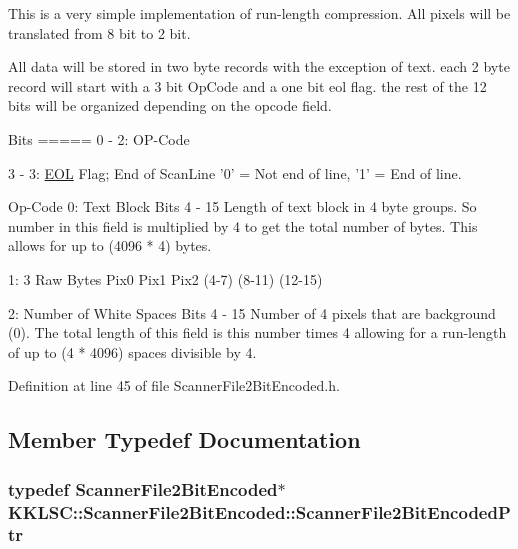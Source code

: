 This is a very simple implementation of run-\/length compression. All pixels will be translated from 8 bit to 2 bit. 
\begin{DoxyCode}
 All data will be stored in two byte records with the exception of text.
 each 2 byte record will start with a 3 bit OpCode and a one bit eol flag.
 the rest of the 12 bits will be organized depending on the opcode field.

 Bits
 =====
 0 - 2:  OP-Code

 3 - 3:  \hyperlink{_usf_cas_cor_8cpp_a4e67e9429d48a2ba8f833ee3b1dceb5d}{EOL} Flag;  End of ScanLine \textcolor{charliteral}{'0'} = Not end of line,   \textcolor{charliteral}{'1'} = End of line.

Op-Code
  0: Text Block
     Bits 4 - 15  Length of text block in 4 byte groups.  So number in \textcolor{keyword}{this} field 
                  is multiplied by 4 to \textcolor{keyword}{get} the total number of bytes.  This allows
                  \textcolor{keywordflow}{for} up to (4096 * 4) bytes.  

  1: 3 Raw Bytes
      Pix0  Pix1   Pix2
     (4-7) (8-11) (12-15)

  2: Number of White Spaces
     Bits 4 - 15  Number of 4 pixels that are background (0).  The total length of
                  this field is this number times 4 allowing for a run-length of up
                  to (4 * 4096) spaces divisible by 4.
\end{DoxyCode}
 

Definition at line 45 of file Scanner\+File2\+Bit\+Encoded.\+h.



\subsection{Member Typedef Documentation}
\subsubsection[{\texorpdfstring{Scanner\+File2\+Bit\+Encoded\+Ptr}{ScannerFile2BitEncodedPtr}}]{\setlength{\rightskip}{0pt plus 5cm}typedef {\bf Scanner\+File2\+Bit\+Encoded}$\ast$ {\bf K\+K\+L\+S\+C\+::\+Scanner\+File2\+Bit\+Encoded\+::\+Scanner\+File2\+Bit\+Encoded\+Ptr}}\hypertarget{class_k_k_l_s_c_1_1_scanner_file2_bit_encoded_a7cf72359f00a78ee199521a98119b2f4}{}\label{class_k_k_l_s_c_1_1_scanner_file2_bit_encoded_a7cf72359f00a78ee199521a98119b2f4}


